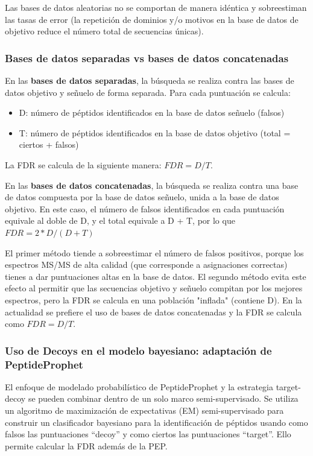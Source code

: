 Las bases de datos aleatorias no se comportan de manera idéntica y sobreestiman las tasas de error (la repetición de dominios y/o motivos en la base de datos de objetivo reduce el número total de secuencias únicas).

\subsubsection{Bases de datos separadas vs bases de datos concatenadas}
En las \textbf{bases de datos separadas}, la búsqueda se realiza contra las bases de datos objetivo y señuelo de forma separada. Para cada puntuación se calcula:
\begin{itemize}
\item D: número de péptidos identificados en la base de datos señuelo (falsos)
\item T: número de péptidos identificados en la base de datos objetivo (total = ciertos + falsos)
\end{itemize}
La FDR se calcula de la siguiente manera: $FDR = D / T$.

En las \textbf{bases de datos concatenadas}, la búsqueda se realiza contra una base de datos compuesta por la base de datos señuelo, unida a la base de datos objetivo. En este caso, el número de falsos identificados en cada puntuación equivale al doble de D, y el total equivale a D + T, por lo que $FDR = 2 * D / (D + T)$

El primer método tiende a sobreestimar el número de falsos positivos, porque los espectros MS/MS de alta calidad (que corresponde a asignaciones correctas) tienes a dar puntuaciones altas en la base de datos. El segundo método evita este efecto al permitir que las secuencias objetivo y señuelo compitan por los mejores espectros, pero la FDR se calcula en una población "inflada" (contiene D). En la actualidad se prefiere el uso de bases de datos concatenadas y la FDR se calcula como $FDR = D / T$.

\subsubsection{Uso de Decoys en el modelo bayesiano: adaptación de PeptideProphet}
El enfoque de modelado probabilístico de PeptideProphet y la estrategia target-decoy se pueden combinar dentro de un solo marco semi-supervisado. Se utiliza un algoritmo de maximización de expectativas (EM) semi-supervisado para construir un clasificador bayesiano para la identificación de péptidos usando como falsos las puntuaciones “decoy” y como ciertos las puntuaciones “target”. Ello permite calcular la FDR además de la PEP.

